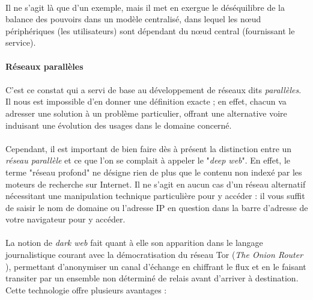 \paragraph{} Il ne s'agit là que d'un exemple, mais il met en exergue le déséquilibre de la balance des pouvoirs dans un 
modèle centralisé, dans lequel les n\oe{}ud périphériques (les utilisateurs) sont dépendant du n\oe{}ud central (fournissant
le service).


\paragraph{Réseaux parallèles}

\paragraph{} C'est ce constat qui a servi de base au développement de réseaux dits \emph{parallèles}. Il nous est
impossible d'en donner une définition exacte ; en effet, chacun va adresser une solution à un problème particulier,
offrant une alternative voire induisant une évolution des usages dans le domaine concerné.

\paragraph{} Cependant, il est important de bien faire dès à présent la distinction entre un \emph{réseau parallèle} et 
ce que l'on se complait à appeler le "\emph{deep web}". En effet, le terme "réseau profond" ne
désigne rien de plus que le contenu non indexé par les moteurs de recherche sur Internet. Il ne s'agit en aucun cas d'un
réseau alternatif nécessitant une manipulation technique particulière pour y accéder : il vous suffit de saisir le nom de
domaine ou l'adresse IP en question dans la barre d'adresse de votre navigateur pour y accéder.

\paragraph{} La notion de \emph{dark web} fait quant à elle son apparition dans le langage journalistique courant avec la 
démocratisation du réseau Tor (\emph{The Onion Router} \cite{Internet4}), permettant d'anonymiser un canal d'échange en chiffrant
le flux et en le faisant transiter par un ensemble non déterminé de relais avant d'arriver à destination. Cette technologie
offre plusieurs avantages : 

